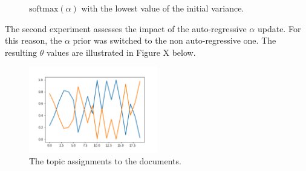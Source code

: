 \documentclass[12pt]{article}
\begin{document}
\begin{figure}[H]
\begin{subfigure}[b]{0.33\textwidth}
  \end{subfigure}
  \caption{$\mbox{softmax}(\alpha)$ with the lowest value of the initial variance.}\label{fig:animals}
\end{figure}


\par The second experiment assesses the impact of the auto-regressive $\alpha$ update. For this reason, the $\alpha$ prior was switched to the non auto-regressive one. The resulting $\theta$ values are illustrated in Figure X below.

\begin{figure}[H]
  \centering
  \includegraphics[width=0.5\textwidth]{thetas}
  \caption{The topic assignments to the documents.}
  \label{fig:mu}
\end{figure}




%
\end{document}
